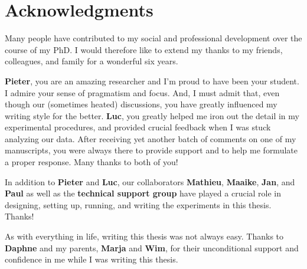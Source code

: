 \clearpage
\pagestyle{empty}

\chapter*{Acknowledgments}
{}

Many people have contributed to my social and professional development over the course of my PhD. I would therefore like to extend my thanks to my friends, colleagues, and family for a wonderful six years.

\textbf{Pieter}, you are an amazing researcher and I'm proud to have been your student. I admire your sense of pragmatism and focus. And, I must admit that, even though our (sometimes heated) discussions, you have greatly influenced my writing style for the better. \textbf{Luc}, you greatly helped me iron out the detail in my experimental procedures, and provided crucial feedback when I was stuck analyzing our data. After receiving yet another batch of comments on one of my manuscripts, you were always there to provide support and to help me formulate a proper response. Many thanks to both of you!

In addition to \textbf{Pieter} and \textbf{Luc}, our collaborators \textbf{Mathieu}, \textbf{Maaike}, \textbf{Jan}, and \textbf{Paul} as well as the \textbf{technical support group} have played a crucial role in designing, setting up, running, and writing the experiments in this thesis. Thanks!

As with everything in life, writing this thesis was not always easy. Thanks to \textbf{Daphne} and my parents, \textbf{Marja} and \textbf{Wim}, for their unconditional support and confidence in me while I was writing this thesis.

